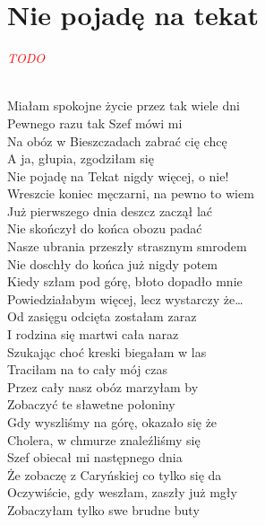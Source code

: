 \documentclass[a5paper, 10pt]{book}
\begin{document}
\newpage
\section{Nie pojadę na tekat}\textcolor{red}{\textit{TODO}}\\~\\
\begin{minipage}[t]{0.8\textwidth}

  Miałam spokojne życie przez tak wiele dni	\\
  Pewnego razu tak Szef mówi mi	\\
  Na obóz w Bieszczadach zabrać cię chcę 	\\
  A ja, głupia, zgodziłam się	\\

  \hspace*{5mm}Nie pojadę na Tekat nigdy więcej, o nie!		\\
  \hspace*{5mm}Wreszcie koniec męczarni, na pewno to wiem	\\

  Już pierwszego dnia deszcz zaczął lać 		\\
  Nie skończył do końca obozu padać\\
  Nasze ubrania przeszły strasznym smrodem 	\\
  Nie doschły do końca już nigdy potem\\

  \hspace*{5mm}Kiedy szłam pod górę, błoto dopadło mnie 	\\
  \hspace*{5mm}Powiedziałabym więcej, lecz wystarczy że…\\

  Od zasięgu odcięta zostałam zaraz 		\\
  I rodzina się martwi cała naraz	\\
  Szukając choć kreski biegałam w las 		\\
  Traciłam na to cały mój czas	\\

  Przez cały nasz obóz marzyłam by		\\
  Zobaczyć te sławetne połoniny	\\
  Gdy wyszliśmy na górę, okazało się że		\\
  Cholera, w chmurze znaleźliśmy się\\

  Szef obiecał mi następnego dnia		\\
  Że zobaczę z Caryńskiej co tylko się da\\
  Oczywiście, gdy weszłam, zaszły już mgły 	\\
  Zobaczyłam tylko swe brudne buty\\


\end{minipage}
\end{document}
